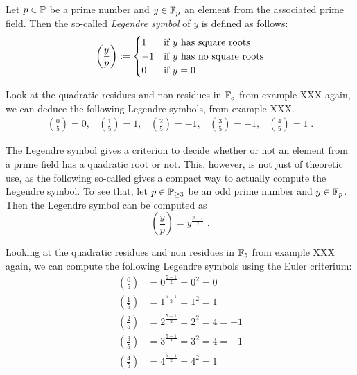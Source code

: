 Let $ p \in \mathbb{P} $ be a prime number and $ y \in \mathbb{F}_p $ an element from the associated prime field. Then the so-called \textit{Legendre symbol} of $ y $ is defined as follows:
\begin{equation}
\label{eq: Legendre-symbol}
\left (\frac{y}{p} \right): =
\begin{cases}
1 & \text{if $ y $ has square roots} \\
-1 & \text{if $ y $ has no square roots} \\
0 & \text{if $ y = 0 $}
\end{cases}
\end{equation}
\begin{example}
Look at the quadratic residues and non residues in $\mathbb{F}_5$ from example XXX again, we can deduce the following Legendre symbols, from example XXX.
$$
\begin{array}{ccccc}
\left (\frac{0}{5} \right) = 0, &
\left (\frac{1}{5} \right) = 1, &
\left (\frac{2}{5} \right) = -1, &
\left (\frac{3}{5} \right) = -1, &
\left (\frac{4}{5} \right) = 1 \;.
\end{array}
$$
\end{example}
The Legendre symbol gives a criterion to decide whether or not an element from a prime field has a quadratic root or not. This, however, is not just of theoretic use, as the following so-called  gives a compact way to actually compute the Legendre symbol. To see that, let $ p \in \mathbb{P}_{\geq 3} $ be an odd prime number and $ y \in \mathbb{F}_p $. Then the Legendre symbol can be computed as
\begin{equation}
\label{eq: Euler_criterium}
\left (\frac{y}{p} \right) = y^{\frac{p-1}{2}} \;.
\end{equation}
\begin{example}
Looking at the quadratic residues and non residues in $\mathbb{F}_5$ from example XXX again, we can compute the following Legendre symbols using the Euler criterium:
\begin{align*}
\left (\frac{0}{5} \right) &= 0^{\frac{5-1}{2}}= 0^2=0\\
\left (\frac{1}{5} \right) &= 1^{\frac{5-1}{2}}= 1^2=1\\
\left (\frac{2}{5} \right) &= 2^{\frac{5-1}{2}}= 2^2=4 = -1\\
\left (\frac{3}{5} \right) &= 3^{\frac{5-1}{2}}= 3^2=4 =-1\\
\left (\frac{4}{5} \right) &= 4^{\frac{5-1}{2}}= 4^2=1
\end{align*}
\end{example}
